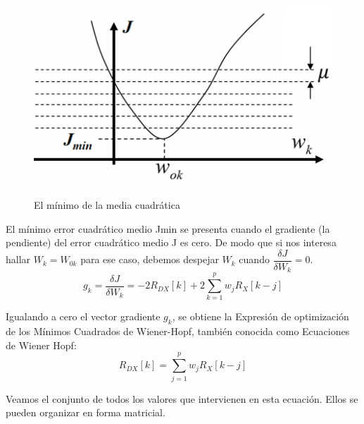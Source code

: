 \begin{itemize}
\begin{figure}[h!]
	\captionsetup{justification = raggedright, singlelinecheck = false}
	\caption{El mínimo de la media cuadrática } 
	\centering
	\includegraphics[scale=1]{Imagenes/Jmin.png}
	\label{fig:Jmin}
\end{figure}
\end{itemize}

El mínimo error cuadrático medio Jmin  se presenta cuando el gradiente (la pendiente) del error cuadrático medio J es cero. De modo que si nos interesa hallar $W_k=W_{0k}$ para ese caso, debemos despejar $W_k$ cuando $ \dfrac{ \delta J}{ \delta W_{k}}= 0$. \\

\begin{equation} \label{capcuatro_cuarentayseis}
	g_k = \dfrac{ \delta J}{ \delta W_{k}}= -2R_{DX}[k]+2 \sum_{k=1}^{p} w_j R_{X}[k-j]
\end{equation}

Igualando a cero el vector gradiente $g_k$, se obtiene la Expresión de optimización de los Mínimos Cuadrados de Wiener-Hopf, también conocida como Ecuaciones de Wiener Hopf: \\

\begin{equation} \label{capcuatro_cuarentaysiete}
	 R_{DX}[k] = \sum_{j=1}^{p} w_j R_X [k-j]
\end{equation}

Veamos el conjunto de todos los valores que intervienen en esta ecuación. Ellos se pueden organizar en forma matricial. \\

